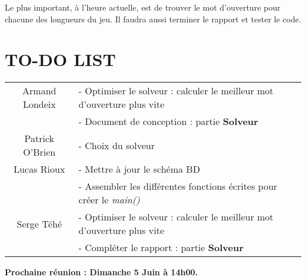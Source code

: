 \tabto{1cm}Le plus important, à l'heure actuelle, est de trouver le mot d'ouverture pour chacune des longueurs du jeu. Il faudra aussi terminer le rapport et tester le code.

\section*{TO-DO LIST}

\begin{center}
\begin{tabular}{|c|l|}
    \hline
    Armand Londeix & - Optimiser le solveur : calculer le meilleur mot d'ouverture plus vite \\
    & - Document de conception : partie \textbf{Solveur} \\
    \hline
    Patrick O'Brien & - Choix du solveur \\
    \hline
    Lucas Rioux & - Mettre à jour le schéma BD \\
    & - Assembler les différentes fonctions écrites pour créer le \emph{main()} \\
    \hline
    Serge Téhé & - Optimiser le solveur : calculer le meilleur mot d'ouverture plus vite \\
    & - Compléter le rapport : partie \textbf{Solveur} \\
    \hline
\end{tabular}
\end{center}

\tabto{0cm}\textbf{Prochaine réunion : Dimanche 5 Juin à 14h00.}